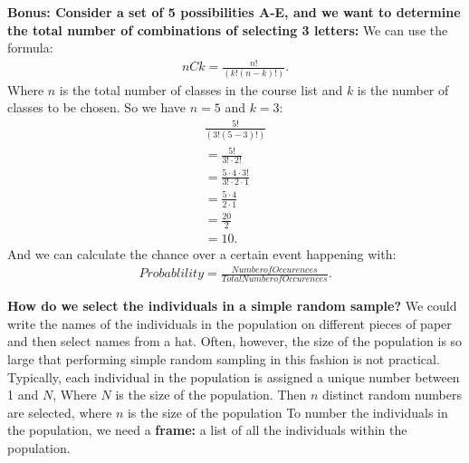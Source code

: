 \documentclass{report}
\begin{document}
        \bigbreak \noindent 
        \begin{mdframed}
          \textbf{Bonus: Consider a set of 5 possibilities A-E, and we want to determine the total number of combinations of selecting 3 letters:}
          \bigbreak \noindent 
          We can use the formula:
          \begin{align*}
              nCk = \frac{n!}{(k!(n-k)!)}
          .\end{align*}
          \bigbreak \noindent 
          Where $n $ is the total number of classes in the course list and $k$ is the number of classes to be chosen.
          \bigbreak \noindent 
          So we have $n =5$ and $k = 3$:
          \begin{align*}
                \frac{5!}{(3!(5-3)!)} \\
                = \frac{5!}{3! \cdot 2!}\\
                 = \frac{5 \cdot 4 \cdot 3!}{3! \cdot 2\cdot 1} \\
                 = \frac{5 \cdot 4}{2\cdot 1} \\
                 = \frac{20}{2} \\
                 = 10
          .\end{align*}
          \bigbreak \noindent 
          And we can calculate the chance over a certain event happening with:
          \begin{align*}
              Probablility = \frac{Number of Occurences}{Total Number of Occurences}
          .\end{align*}
        \end{mdframed}

        \bigbreak \noindent 
        \textbf{How do we select the individuals in a simple random sample?}
        \bigbreak \noindent 
        We could write the names of the individuals in the population on different pieces of paper and then select names from a hat. Often, however, the size of the population is so large that performing simple random sampling in this fashion is not practical.
        \bigbreak \noindent 
        Typically, each individual in the population is assigned a unique number between 1 and $N$, Where $N$ is the size of the population. Then $n $ distinct random numbers are selected, where $n $ is the size of the population
        \bigbreak \noindent 
        To number the individuals in the population, we need a \textbf{frame:} a list of all the individuals within the population.
\end{document}
